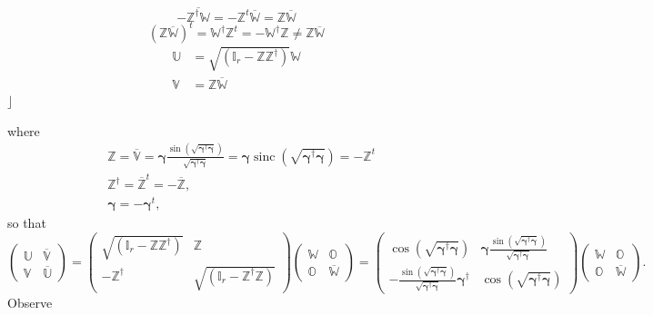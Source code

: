 \documentclass[aps, preprint]{revtex4}
\begin{document}
\begin{equation} -\overline{\mathbb{Z}^{ \dag } \mathbb{W}} = -\mathbb{Z}^{t} \overline{\mathbb{W}} =\mathbb{Z} \overline{\mathbb{W}}
\end{equation}
\begin{equation}\left (\mathbb{Z} \overline{\mathbb{W}}\right )^{t} =\mathbb{W}^{ \dag } \mathbb{Z}^{t} = -\mathbb{W}^{ \dag } \mathbb{Z} \neq \mathbb{Z} \overline{\mathbb{W}}
\end{equation}
\begin{align}\mathbb{U} &  =\sqrt{\left (\mathbb{I}_{r} -\mathbb{Z} \mathbb{Z}^{ \dag }\right )} \mathbb{W} \\
\mathbb{V} &  =\mathbb{Z} \overline{\mathbb{W}}\end{align}$\rfloor \;$ 

where
\begin{align*} & \mathbb{Z} =\overline{\mathbb{V}} =\mathbf{\gamma } \frac{\sin  \left (\sqrt{\mathbf{\gamma }^{ \dag } \mathbf{\gamma }}\right )}{\sqrt{\mathbf{\gamma }^{ \dag } \mathbf{\gamma }}} =\mathbf{\gamma } \ensuremath{\operatorname*{sinc}} \left (\sqrt{\mathbf{\gamma }^{ \dag } \mathbf{\gamma }}\right ) = -\mathbb{Z}^{t} \\
 & \mathbb{Z}^{ \dag } =\overline{\mathbb{Z}}^{t} = -\overline{\mathbb{Z}}\text{,} \\
 & \mathbf{\gamma }  = -\mathbf{\gamma }^{t}\text{,}\end{align*}so that
\begin{equation}\left (\begin{array}{cc}\mathbb{U} & \overline{\mathbb{V}} \\
\mathbb{V} & \overline{\mathbb{U}}\end{array}\right ) =\left (\begin{array}{cc}\sqrt{\left (\mathbb{I}_{r} -\mathbb{Z} \mathbb{Z}^{ \dag }\right )} & \mathbb{Z} \\
 -\mathbb{Z}^{ \dag } & \sqrt{\left (\mathbb{I}_{r} -\mathbb{Z}^{ \dag } \mathbb{Z}\right )}\end{array}\right ) \left (\begin{array}{cc}\mathbb{W} & \mathbb{O} \\
\mathbb{O} & \overline{\mathbb{W}}\end{array}\right ) =\left (\begin{array}{cc}\cos  \left (\sqrt{\mathbf{\gamma }^{ \dag } \mathbf{\gamma }}\right ) & \mathbf{\gamma } \frac{\sin  \left (\sqrt{\mathbf{\gamma }^{ \dag } \mathbf{\gamma }}\right )}{\sqrt{\mathbf{\gamma }^{ \dag } \mathbf{\gamma }}} \\
 -\frac{\sin  \left (\sqrt{\mathbf{\gamma }^{ \dag } \mathbf{\gamma }}\right )}{\sqrt{\mathbf{\gamma }^{ \dag } \mathbf{\gamma }}} \mathbf{\gamma }^{ \dag } & \cos  \left (\sqrt{\mathbf{\gamma }^{ \dag } \mathbf{\gamma }}\right )\end{array}\right ) \left (\begin{array}{cc}\mathbb{W} & \mathbb{O} \\
\mathbb{O} & \overline{\mathbb{W}}\end{array}\right )\text{.}
\end{equation}Observe
\end{document}
